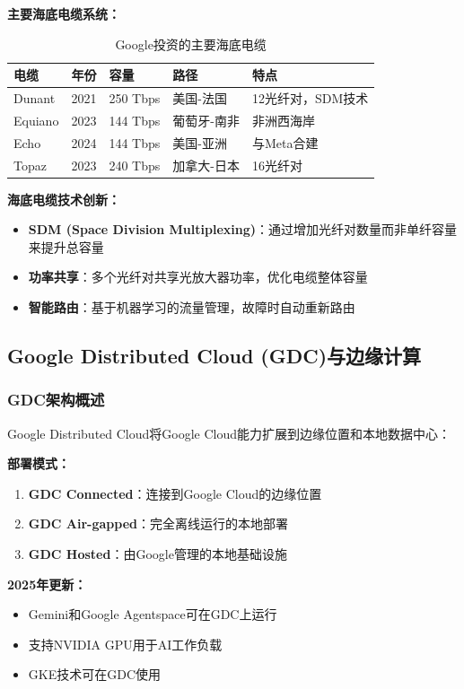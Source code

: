 \textbf{主要海底电缆系统：}

\begin{table}[htbp]
\centering
\caption{Google投资的主要海底电缆}
\begin{tabular}{|l|l|l|l|l|}
\hline
\textbf{电缆} & \textbf{年份} & \textbf{容量} & \textbf{路径} & \textbf{特点} \\
\hline
Dunant & 2021 & 250 Tbps & 美国-法国 & 12光纤对，SDM技术 \\
Equiano & 2023 & 144 Tbps & 葡萄牙-南非 & 非洲西海岸 \\
Echo & 2024 & 144 Tbps & 美国-亚洲 & 与Meta合建 \\
Topaz & 2023 & 240 Tbps & 加拿大-日本 & 16光纤对 \\
\hline
\end{tabular}
\end{table}

\textbf{海底电缆技术创新：}
\begin{itemize}
    \item \textbf{SDM (Space Division Multiplexing)}：通过增加光纤对数量而非单纤容量来提升总容量
    \item \textbf{功率共享}：多个光纤对共享光放大器功率，优化电缆整体容量
    \item \textbf{智能路由}：基于机器学习的流量管理，故障时自动重新路由
\end{itemize}

\subsection{Google Distributed Cloud (GDC)与边缘计算}

\subsubsection{GDC架构概述}

Google Distributed Cloud将Google Cloud能力扩展到边缘位置和本地数据中心：

\textbf{部署模式：}
\begin{enumerate}
    \item \textbf{GDC Connected}：连接到Google Cloud的边缘位置
    \item \textbf{GDC Air-gapped}：完全离线运行的本地部署
    \item \textbf{GDC Hosted}：由Google管理的本地基础设施
\end{enumerate}

\textbf{2025年更新：}
\begin{itemize}
    \item Gemini和Google Agentspace可在GDC上运行
    \item 支持NVIDIA GPU用于AI工作负载
    \item GKE技术可在GDC使用
\end{itemize}

